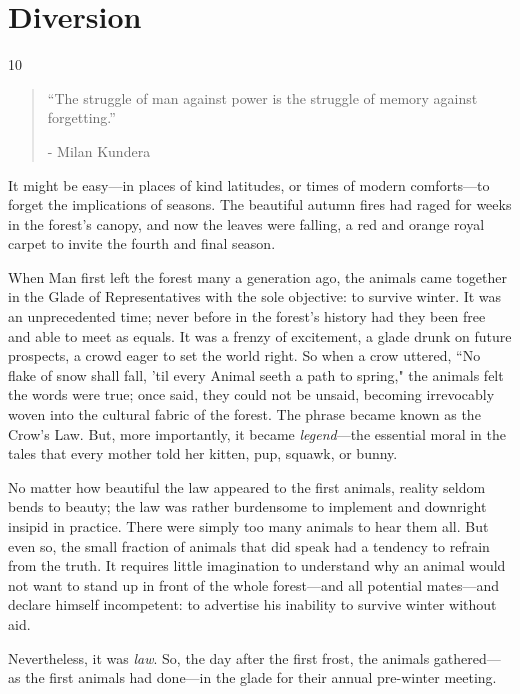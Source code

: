 \chapter{Diversion}

\vspace{-1.3cm}
\begin{localsize}{10}
	\begin{quote}
		“The struggle of man against power is the struggle of memory against forgetting.”
		\begin{flushright}- Milan Kundera \end{flushright}
	\end{quote} 
\end{localsize}
\vspace{1cm}

It might be easy---in places of kind latitudes, or times of modern comforts---to forget the implications of seasons.
The beautiful autumn fires had raged for weeks in the forest's canopy, and now the leaves were falling, a red and orange royal carpet to invite the fourth and final season.

When Man first left the forest many a generation ago, the animals came together in the Glade of Representatives with the sole objective: to survive winter.
It was an unprecedented time; never before in the forest's history had they been free and able to meet as equals.
It was a frenzy of excitement, a glade drunk on future prospects, a crowd eager to set the world right.
So when a crow uttered, ``No flake of snow shall fall, 'til every Animal seeth a path to spring," the animals felt the words were true; once said, they could not be unsaid, becoming irrevocably woven into the cultural fabric of the forest.
The phrase became known as the Crow's Law.
But, more importantly, it became \textit{legend}---the essential moral in the tales that every mother told her kitten, pup, squawk, or bunny.

No matter how beautiful the law appeared to the first animals, reality seldom bends to beauty; the law was rather burdensome to implement and downright insipid in practice.
There were simply too many animals to hear them all.
But even so, the small fraction of animals that did speak had a tendency to refrain from the truth.
It requires little imagination to understand why an animal would not want to stand up in front of the whole forest---and all potential mates---and declare himself incompetent: to advertise his inability to survive winter without aid.

Nevertheless, it was \textit{law}.
So, the day after the first frost, the animals gathered---as the first animals had done---in the glade for their annual pre-winter meeting.\\

